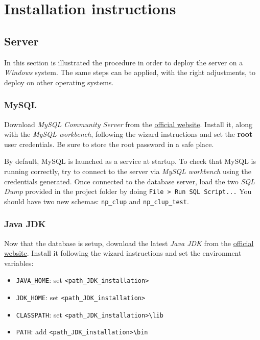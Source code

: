 \chapter{Installation instructions}
\section{Server}
In this section is illustrated the procedure in order to deploy the server on a \textit{Windows} system.\newline
The same steps can be applied, with the right adjustments, to deploy on other operating systems.

\subsection{MySQL}
Download \textit{MySQL Community Server} from the \href{https://dev.mysql.com/downloads/mysql/}{official website}.\newline
Install it, along with the \textit{MySQL workbench}, following the wizard instructions and set the \textbf{root} user credentials. Be sure to store the root password in a safe place.

By default, MySQL is launched as a service at startup.\newline
To check that MySQL is running correctly, try to connect to the server via \textit{MySQL workbench} using the credentials generated.\newline
Once connected to the database server, load the two \textit{SQL Dump} provided in the project folder by doing \verb|File > Run SQL Script...|\newline
You should have two new schemas: \verb|np_clup| and \verb|np_clup_test|.

\subsection{Java JDK}
Now that the database is setup, download the latest \textit{Java JDK} from the \href{https://www.oracle.com/it/java/technologies/javase-jdk15-downloads.html}{official website}.\newline
Install it following the wizard instructions and set the environment variables:
\begin{itemize}
	\item \verb|JAVA_HOME|: set \verb|<path_JDK_installation>|
	\item \verb|JDK_HOME|: set \verb|<path_JDK_installation>|
	\item \verb|CLASSPATH|: set \verb|<path_JDK_installation>\lib|
	\item \verb|PATH|: add \verb|<path_JDK_installation>\bin|
\end{itemize}
\clearpage
